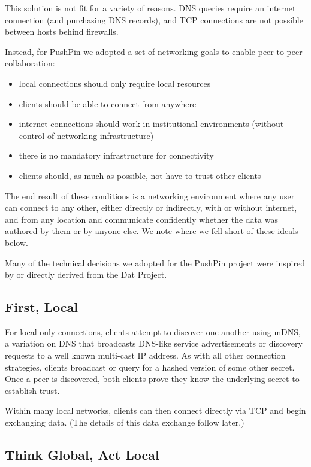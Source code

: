 \documentclass[sigplan,10pt]{acmart}
\begin{document}
This solution is not fit for a variety of reasons. DNS queries require an internet connection (and purchasing DNS records), and TCP connections are not possible between hosts behind firewalls.

Instead, for PushPin we adopted a set of networking goals to enable peer-to-peer collaboration:
\begin{itemize}
  \item local connections should only require local resources
  \item clients should be able to connect from anywhere
  \item internet connections should work in institutional environments (without control of networking infrastructure)
  \item there is no mandatory infrastructure for connectivity
  \item clients should, as much as possible, not have to trust other clients
\end{itemize}

The end result of these conditions is a networking environment where any user can connect to any other, either directly or indirectly, with or without internet, and from any location and communicate confidently whether the data was authored by them or by anyone else. We note where we fell short of these ideals below.

Many of the technical decisions we adopted for the PushPin project were inspired by or directly derived from the Dat Project\cite{DatProject}.

\subsection{First, Local}

For local-only connections, clients attempt to discover one another using mDNS, a variation on DNS that broadcasts DNS-like service advertisements or discovery requests to a well known multi-cast IP address. As with all other connection strategies, clients broadcast or query for a hashed version of some other secret. Once a peer is discovered, both clients prove they know the underlying secret to establish trust.

Within many local networks, clients can then connect directly via TCP and begin exchanging data. (The details of this data exchange follow later.)

\subsection{Think Global, Act Local}
\end{document}
